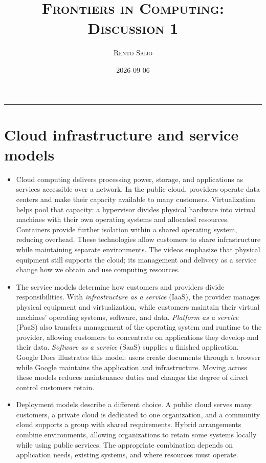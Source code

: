 \documentclass[10pt]{article}
\title{\Large\textsc{Frontiers in Computing: Discussion 1}}
\author{\large\textsc{Rento Saijo}}
\date{2026-09-06}
\begin{document}
\maketitle
\thispagestyle{fancy}
\vspace{-1em}\rule{\linewidth}{0.6pt}\vspace{0.5em}

\section*{Cloud infrastructure and service models}

\begin{itemize}[leftmargin=1.25em, itemsep=0.3em, parsep=0pt, topsep=0pt]
    \item Cloud computing delivers processing power, storage, and applications as services accessible over a network. In the public cloud, providers operate data centers and make their capacity available to many customers. Virtualization helps pool that capacity: a hypervisor divides physical hardware into virtual machines with their own operating systems and allocated resources. Containers provide further isolation within a shared operating system, reducing overhead. These technologies allow customers to share infrastructure while maintaining separate environments. The videos emphasize that physical equipment still supports the cloud; its management and delivery as a service change how we obtain and use computing resources.

    \item The service models determine how customers and providers divide responsibilities. With \textit{infrastructure as a service} (IaaS), the provider manages physical equipment and virtualization, while customers maintain their virtual machines' operating systems, software, and data. \textit{Platform as a service} (PaaS) also transfers management of the operating system and runtime to the provider, allowing customers to concentrate on applications they develop and their data. \textit{Software as a service} (SaaS) supplies a finished application. Google Docs illustrates this model: users create documents through a browser while Google maintains the application and infrastructure. Moving across these models reduces maintenance duties and changes the degree of direct control customers retain.

    \item Deployment models describe a different choice. A public cloud serves many customers, a private cloud is dedicated to one organization, and a community cloud supports a group with shared requirements. Hybrid arrangements combine environments, allowing organizations to retain some systems locally while using public services. The appropriate combination depends on application needs, existing systems, and where resources must operate.
\end{itemize}
\end{document}
